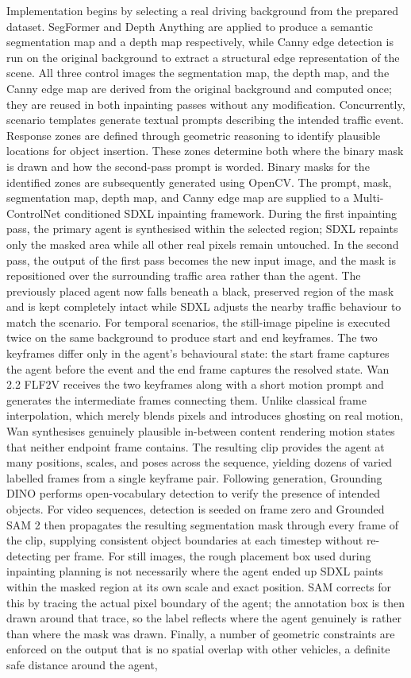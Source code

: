Implementation begins by selecting a real driving background from the prepared dataset. SegFormer and Depth Anything are applied to produce a semantic segmentation map and a depth map respectively, while Canny edge detection is run on the original background to extract a structural edge representation of the scene. All three control images the segmentation map, the depth map, and the Canny edge map are derived from the original background and computed once; they are reused in both inpainting passes without any modification. Concurrently, scenario templates generate textual prompts describing the intended traffic event.
Response zones are defined through geometric reasoning to identify plausible locations for object insertion. These zones determine both where the binary mask is drawn and how the second-pass prompt is worded. Binary masks for the identified zones are subsequently generated using OpenCV.
The prompt, mask, segmentation map, depth map, and Canny edge map are supplied to a Multi-ControlNet conditioned SDXL inpainting framework. During the first inpainting pass, the primary agent is synthesised within the selected region; SDXL repaints only the masked area while all other real pixels remain untouched. In the second pass, the output of the first pass becomes the new input image, and the mask is repositioned over the surrounding traffic area rather than the agent. The previously placed agent now falls beneath a black, preserved region of the mask and is kept completely intact while SDXL adjusts the nearby traffic behaviour to match the scenario.
For temporal scenarios, the still-image pipeline is executed twice on the same background to produce start and end keyframes. The two keyframes differ only in the agent's behavioural state: the start frame captures the agent before the event and the end frame captures the resolved state. Wan 2.2 FLF2V receives the two keyframes along with a short motion prompt and generates the intermediate frames connecting them. Unlike classical frame interpolation, which merely blends pixels and introduces ghosting on real motion, Wan synthesises genuinely plausible in-between content rendering motion states that neither endpoint frame contains. The resulting clip provides the agent at many positions, scales, and poses across the sequence, yielding dozens of varied labelled frames from a single keyframe pair.
Following generation, Grounding DINO performs open-vocabulary detection to verify the presence of intended objects. For video sequences, detection is seeded on frame zero and Grounded SAM 2 then propagates the resulting segmentation mask through every frame of the clip, supplying consistent object boundaries at each timestep without re-detecting per frame. For still images, the rough placement box used during inpainting planning is not necessarily where the agent ended up SDXL paints within the masked region at its own scale and exact position. SAM corrects for this by tracing the actual pixel boundary of the agent; the annotation box is then drawn around that trace, so the label reflects where the agent genuinely is rather than where the mask was drawn. Finally, a number of geometric constraints are enforced on the output that is no spatial overlap with other vehicles, a definite safe distance around the agent,
